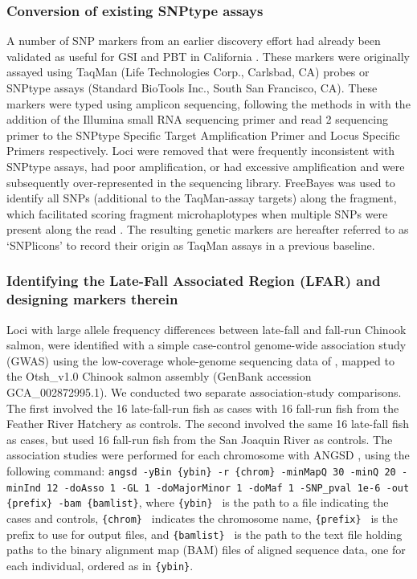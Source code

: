 \subsubsection*{Conversion of existing SNPtype assays}

A number of SNP markers from an earlier discovery effort \citep{clemento2011discovery} had already
been validated as useful for GSI
and PBT in California \citep{clemento2014evaluation}. These markers were originally assayed
using TaqMan (Life Technologies Corp., Carlsbad, CA) probes or SNPtype assays (Standard BioTools Inc., South San Francisco, CA).
These markers were typed using amplicon sequencing, following the methods in
\citet{campbell2015genotyping} with the addition of the Illumina small RNA sequencing primer and
read 2 sequencing primer to the SNPtype Specific Target Amplification Primer and Locus
Specific Primers respectively.  Loci were removed that were frequently inconsistent with SNPtype assays,
had poor amplification, or had excessive amplification and were subsequently over-represented in the sequencing library.  FreeBayes was used to identify all SNPs (additional to the TaqMan-assay targets) along the fragment, which facilitated scoring fragment microhaplotypes when multiple SNPs were present along the read \citep{baetscher2018microhaplotypes}. The resulting genetic markers are hereafter referred to as `SNPlicons' to record their origin as TaqMan assays in a previous
baseline.


\subsubsection*{Identifying the Late-Fall Associated Region (LFAR) and designing markers therein}

Loci with large allele frequency differences between late-fall and fall-run Chinook salmon,
were identified with a simple case-control genome-wide association study (GWAS) using the low-coverage whole-genome sequencing
data of \citet{thompson2020complex}, mapped to the Otsh\_v1.0 Chinook salmon assembly
(GenBank accession GCA\_002872995.1).  We conducted
two separate association-study comparisons.
The first involved the 16 late-fall-run fish as cases with 16 fall-run fish from the Feather River Hatchery as controls.
The second involved the same 16 late-fall fish as cases, but used 16 fall-run fish from the San
Joaquin River as controls.  The association studies were performed for each chromosome with
ANGSD \citep{pmid21663684,korneliussen_angsd_2014}, using the following command: {\footnotesize\tt angsd -yBin \{ybin\}  -r \{chrom\}
-minMapQ 30 -minQ 20 -minInd 12 -doAsso 1 -GL 1 -doMajorMinor 1 -doMaf 1 -SNP\_pval 1e-6
-out \{prefix\}  -bam \{bamlist\}}, where {\tt \{ybin\} } is the path to a file indicating the cases and
controls,
{\tt \{chrom\} } indicates the chromosome name, {\tt \{prefix\} } is the prefix to use for output files, and
{\tt \{bamlist\} } is the path to the text file holding paths to the binary alignment map (BAM) files
of aligned sequence data, one for each individual, ordered as in {\tt \{ybin\}}.

